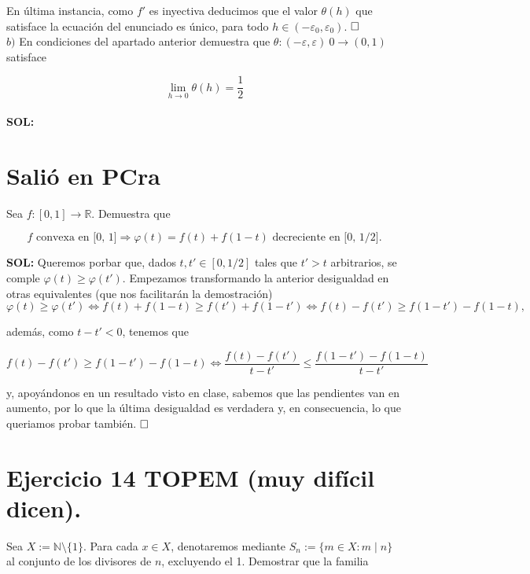 \documentclass{article}
\begin{document}
En última instancia, como $f'$ es inyectiva deducimos que el valor $\theta(h)$ que satisface la ecuación del enunciado es único, para todo $h \in (-\varepsilon_0, \varepsilon_0)$. $\hfill\square$ \\

$b)$ En condiciones del apartado anterior demuestra que $\theta : (-\varepsilon, \varepsilon) \ {0} \longrightarrow (0, 1)$ satisface

\[\lim_{h \to 0} \theta(h) = \frac{1}{2}\] \\

\noindent\textbf{SOL:} 

\newpage

\section{Salió en PCra}

Sea $f : [0, 1] \longrightarrow \mathbb{R}$. Demuestra que 

\[
f \text{ convexa en [0, 1]} \Longrightarrow \varphi(t) = f(t) + f(1 - t) \text{ decreciente en [0, 1/2].}
\]

\noindent\textbf{SOL:} Queremos porbar que, dados $t, t' \in [0, 1/2]$ tales que $t' > t$ arbitrarios, se comple $\varphi(t) \geq \varphi(t')$. Empezamos transformando la anterior desigualdad en otras equivalentes (que nos facilitarán la demostración)
\[\varphi(t) \geq \varphi(t') \iff f(t) + f(1 - t) \geq f(t') + f(1 - t') \iff f(t) - f(t') \geq f(1 - t') - f(1 - t),\]

\noindent además, como $t - t' < 0$, tenemos que

\[f(t) - f(t') \geq f(1 - t') - f(1 - t) \iff \frac{f(t) - f(t')}{t - t'} \leq \frac{f(1 - t') - f(1 - t)}{t - t'}\]

\noindent y, apoyándonos en un resultado visto en clase, sabemos que las pendientes van en aumento, por lo que la última desigualdad es verdadera y, en consecuencia, lo que queriamos probar también. $\hfill\square$

\newpage

\section{Ejercicio 14 TOPEM (muy difícil dicen).}

Sea $X := \mathbb{N} \setminus \{1\}$. Para cada $x \in X$, denotaremos mediante $S_n := \{m \in X : m \mid n\}$ al conjunto de los divisores de $n$, excluyendo el 1. Demostrar que la familia 
\end{document}
